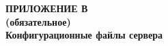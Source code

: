 \begin{center}
\textbf{
\MakeUppercase{Приложение В}\\
(обязательное)\\
Конфигурационные файлы сервера}
\end{center}

